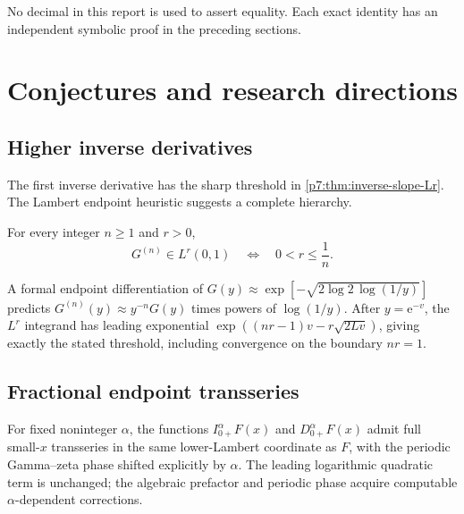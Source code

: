 \documentclass[11pt,oneside]{article}
\theoremstyle{definition}
\theoremstyle{remark}
\newcommand{\e}{\mathrm e}
\newcommand{\1}{\mathbf 1}
\begin{document}
No decimal in this report is used to assert equality.  Each exact identity has an independent
symbolic proof in the preceding sections.

\section{Conjectures and research directions}
\label{p7:sec:future}

\subsection{Higher inverse derivatives}

The first inverse derivative has the sharp threshold in \cref{p7:thm:inverse-slope-Lr}.  The
Lambert endpoint heuristic suggests a complete hierarchy.

\begin{conjecture}
\label{p7:conj:higher-G-derivatives}
For every integer $n\ge1$ and $r>0$,
\begin{equation}
 G^{(n)}\in L^r(0,1)
 \quad\Longleftrightarrow\quad
 0<r\le\frac1n.
 \label{p7:eq:conj-higher-G}
\end{equation}
\statusopen
\end{conjecture}

A formal endpoint differentiation of
$G(y)\approx\exp[-\sqrt{2\log2\,\log(1/y)}]$ predicts
$G^{(n)}(y)\approx y^{-n}G(y)$ times powers of $\log(1/y)$.  After $y=\e^{-v}$, the $L^r$
integrand has leading exponential $\exp((nr-1)v-r\sqrt{2Lv})$, giving exactly the stated
threshold, including convergence on the boundary $nr=1$.

\subsection{Fractional endpoint transseries}

\begin{conjecture}
\label{p7:conj:fractional-transseries}
For fixed noninteger $\alpha$, the functions
$I_{0+}^{\alpha}F(x)$ and $D_{0+}^{\alpha}F(x)$ admit full small-$x$ transseries in the same
lower-Lambert coordinate as $F$, with the periodic Gamma--zeta phase shifted explicitly by
$\alpha$.  The leading logarithmic quadratic term is unchanged; the algebraic prefactor and
periodic phase acquire computable $\alpha$-dependent corrections.
\statusopen
\end{conjecture}
\end{document}
